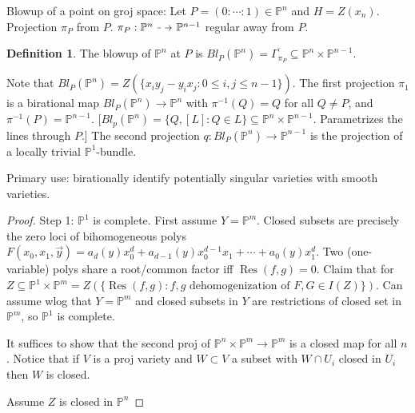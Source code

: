 \documentclass{article}
\theoremstyle{definition}
\newtheorem{defn}{Definition}[section]
\theoremstyle{remark}
\theoremstyle{plain}
\newcommand{\PP}{\mathbb{P}}
\newcommand{\id}{\operatorname{id}}
\newcommand{\Res}{\operatorname{Res}}
\newcommand\dashto{\mathrel{
  -\mkern-6mu{\to}\mkern-20mu{\color{white}\bullet}\mkern12mu
}}
\begin{document}
Blowup of a point on groj space: Let $P=(0:\cdots:1)\in\PP^n$ and $H=Z(x_n)$. Projection $\pi_P$ from $P$. $\pi_P:\PP^n\dashto\PP^{n-1}$ regular away from $P$.
\begin{defn}
    The blowup of $\PP^n$ at $P$ is $Bl_P(\PP^n)=\overline{\Gamma_{\pi_P}}\subseteq \PP^n\times\PP^{n-1}$.
\end{defn}
Note that $Bl_P(\PP^n)=Z(\{x_iy_j-y_ix_j:0\le i,j\le n-1\})$. The first projection $\pi_1$ is a birational map $Bl_P(\PP^n)\to\PP^n$ with $\pi^{-1}(Q)=Q$ for all $Q\neq P$, and $\pi^{-1}(P)=\PP^{n-1}$. [$Bl_p(\PP^n)=\{Q,[L]:Q\in L\}\subseteq \PP^n\times \PP^{n-1}$. Parametrizes the lines through $P$.] The second projection $q:Bl_P(\PP^n)\to\PP^{n-1}$ is the projection of a locally trivial $\PP^1$-bundle. 

Primary use: birationally identify potentially singular varieties with smooth varieties.

\begin{proof}
    Step 1: $\PP^1$ is complete. First assume $Y=\PP^m$. Closed subsets are precisely the zero loci of bihomogeneous polys $F(x_0,x_1,\vec y)=a_d(y)x_0^d+a_{d-1}(y)x_0^{d-1}x_1+\cdots +a_0(y)x_1^d$. Two (one-variable) polys share a root/common factor iff $\Res(f,g)=0$. Claim that for $Z\subseteq \PP^1\times\PP^m=Z(\{\Res(f,g):f,g\text{ dehomogenization of }F,G\in I(Z)\})$. Can assume wlog that $Y=\PP^m$ and closed subsets in $Y$ are restrictions of closed set in $\PP^m$, so $\PP^1$ is complete.

    It suffices to show that the second proj of $\PP^n\times \PP^{m}\to\PP^m$ is a closed map for all $n$. Notice that if $V$ is a proj variety and $W\subset V$ a subset with $W\cap U_i$ closed in $U_i$ then $W$ is closed.
    \begin{center}
    \end{center}
    Assume $Z$ is closed in $\PP^n$
\end{proof}
\end{document}
